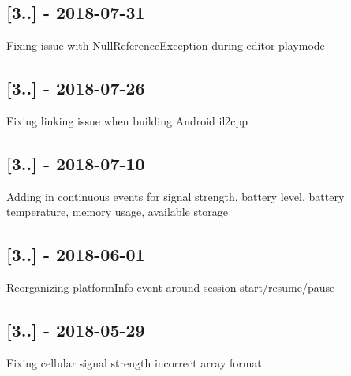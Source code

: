 \subsection*{\mbox{[}3..\mbox{]} -\/ 2018-\/07-\/31}


\begin{DoxyItemize}
\item Fixing issue with Null\+Reference\+Exception during editor playmode
\end{DoxyItemize}

\subsection*{\mbox{[}3..\mbox{]} -\/ 2018-\/07-\/26}


\begin{DoxyItemize}
\item Fixing linking issue when building Android il2cpp
\end{DoxyItemize}

\subsection*{\mbox{[}3..\mbox{]} -\/ 2018-\/07-\/10}


\begin{DoxyItemize}
\item Adding in continuous events for signal strength, battery level, battery temperature, memory usage, available storage
\end{DoxyItemize}

\subsection*{\mbox{[}3..\mbox{]} -\/ 2018-\/06-\/01}


\begin{DoxyItemize}
\item Reorganizing platform\+Info event around session start/resume/pause
\end{DoxyItemize}

\subsection*{\mbox{[}3..\mbox{]} -\/ 2018-\/05-\/29}


\begin{DoxyItemize}
\item Fixing cellular signal strength incorrect array format
\end{DoxyItemize}

